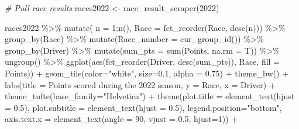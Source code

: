 \documentclass[
]{book}
\newenvironment{Shaded}{\begin{snugshade}}{\end{snugshade}}
\newcommand{\AttributeTok}[1]{\textcolor[rgb]{0.77,0.63,0.00}{#1}}
\newcommand{\CommentTok}[1]{\textcolor[rgb]{0.56,0.35,0.01}{\textit{#1}}}
\newcommand{\DecValTok}[1]{\textcolor[rgb]{0.00,0.00,0.81}{#1}}
\newcommand{\FloatTok}[1]{\textcolor[rgb]{0.00,0.00,0.81}{#1}}
\newcommand{\FunctionTok}[1]{\textcolor[rgb]{0.00,0.00,0.00}{#1}}
\newcommand{\NormalTok}[1]{#1}
\newcommand{\OtherTok}[1]{\textcolor[rgb]{0.56,0.35,0.01}{#1}}
\newcommand{\SpecialCharTok}[1]{\textcolor[rgb]{0.00,0.00,0.00}{#1}}
\newcommand{\StringTok}[1]{\textcolor[rgb]{0.31,0.60,0.02}{#1}}
\begin{document}
\begin{Shaded}
\begin{Highlighting}[]
\CommentTok{\# Pull race results}
\NormalTok{races2022 }\OtherTok{\textless{}{-}} \FunctionTok{race\_result\_scraper}\NormalTok{(}\DecValTok{2022}\NormalTok{)}

\NormalTok{races2022 }\SpecialCharTok{\%\textgreater{}\%}
  \FunctionTok{mutate}\NormalTok{( }\AttributeTok{n =} \DecValTok{1}\SpecialCharTok{:}\FunctionTok{n}\NormalTok{(),}
          \AttributeTok{Race =} \FunctionTok{fct\_reorder}\NormalTok{(Race, }\FunctionTok{desc}\NormalTok{(n))) }\SpecialCharTok{\%\textgreater{}\%}
  \FunctionTok{group\_by}\NormalTok{(Race) }\SpecialCharTok{\%\textgreater{}\%} 
  \FunctionTok{mutate}\NormalTok{(}\AttributeTok{Race\_number =} \FunctionTok{cur\_group\_id}\NormalTok{()) }\SpecialCharTok{\%\textgreater{}\%}
  \FunctionTok{group\_by}\NormalTok{(Driver) }\SpecialCharTok{\%\textgreater{}\%} 
  \FunctionTok{mutate}\NormalTok{(}\AttributeTok{sum\_pts =} \FunctionTok{sum}\NormalTok{(Points, }\AttributeTok{na.rm =}\NormalTok{ T)) }\SpecialCharTok{\%\textgreater{}\%}
  \FunctionTok{ungroup}\NormalTok{() }\SpecialCharTok{\%\textgreater{}\%} 
  \FunctionTok{ggplot}\NormalTok{(}\FunctionTok{aes}\NormalTok{(}\FunctionTok{fct\_reorder}\NormalTok{(Driver, }\FunctionTok{desc}\NormalTok{(sum\_pts)), Race, }\AttributeTok{fill =}\NormalTok{ Points)) }\SpecialCharTok{+}
  \FunctionTok{geom\_tile}\NormalTok{(}\AttributeTok{color=}\StringTok{"white"}\NormalTok{, }\AttributeTok{size=}\FloatTok{0.1}\NormalTok{, }\AttributeTok{alpha =} \FloatTok{0.75}\NormalTok{) }\SpecialCharTok{+}
  \FunctionTok{theme\_bw}\NormalTok{() }\SpecialCharTok{+}
  \FunctionTok{labs}\NormalTok{(}\AttributeTok{title =} \StringTok{\textquotesingle{}Points scored during the 2022 season\textquotesingle{}}\NormalTok{,}
       \AttributeTok{y =} \StringTok{\textquotesingle{}Race\textquotesingle{}}\NormalTok{,}
       \AttributeTok{x =} \StringTok{\textquotesingle{}Driver\textquotesingle{}}\NormalTok{) }\SpecialCharTok{+} 
  \FunctionTok{theme\_tufte}\NormalTok{(}\AttributeTok{base\_family=}\StringTok{"Helvetica"}\NormalTok{)  }\SpecialCharTok{+}
  \FunctionTok{theme}\NormalTok{(}\AttributeTok{plot.title =} \FunctionTok{element\_text}\NormalTok{(}\AttributeTok{hjust =} \FloatTok{0.5}\NormalTok{),}
        \AttributeTok{plot.subtitle =} \FunctionTok{element\_text}\NormalTok{(}\AttributeTok{hjust =} \FloatTok{0.5}\NormalTok{),}
        \AttributeTok{legend.position=}\StringTok{"bottom"}\NormalTok{,}
        \AttributeTok{axis.text.x =} \FunctionTok{element\_text}\NormalTok{(}\AttributeTok{angle =} \DecValTok{90}\NormalTok{, }\AttributeTok{vjust =} \FloatTok{0.5}\NormalTok{, }\AttributeTok{hjust=}\DecValTok{1}\NormalTok{)) }\SpecialCharTok{+}

\end{Highlighting}
\end{Shaded}
\end{document}
